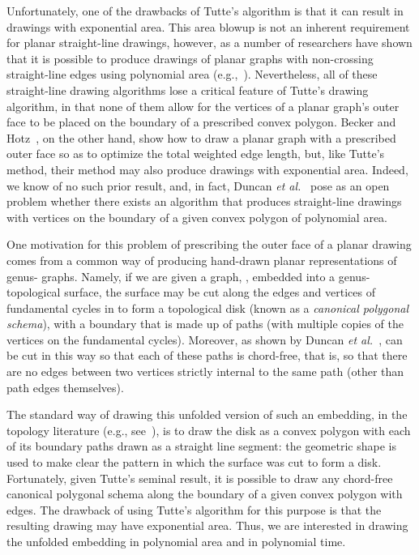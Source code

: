 \documentclass[11pt]{article}
\begin{document}
Unfortunately,
one of the drawbacks of Tutte's algorithm is that it
can result in drawings with exponential area.
This area blowup is not an inherent requirement for planar
straight-line drawings, however, as
a number of researchers have shown that it is possible to
produce drawings of planar graphs with non-crossing straight-line
edges using polynomial area
(e.g.,~\cite{ck-cgd3c-97,cp-ltadp-95,dpp,k-dpguc-96,s-epgg-90}).
Nevertheless, all of these straight-line drawing algorithms lose a
critical feature of Tutte's drawing algorithm, in that none of them
allow for the vertices of a planar graph's outer
face to be placed on the boundary of a prescribed
convex polygon.
Becker and Hotz~\cite{bh-olpgf-87}, on the other hand,
show how to draw a planar graph with
a prescribed outer face so as to optimize the total weighted edge
length, but, like Tutte's method,
their method may also produce drawings with exponential
area.
Indeed, we know of no such prior result, and, in fact,
Duncan {\it et al.}~\cite{duncan}
pose as an open problem whether there exists an algorithm
that produces straight-line drawings with vertices on the boundary
of a given convex polygon of polynomial area.

One motivation for this problem of prescribing the outer face of a planar drawing
comes from a common way of producing hand-drawn
planar representations of genus- graphs.
Namely, if we are given
a graph, , embedded into a
genus- topological surface,
the surface may be cut along
the edges and vertices of  fundamental cycles in  to form a topological disk (known as a \emph{canonical polygonal schema}), with a boundary that is made up
of  paths (with multiple copies of the vertices on the fundamental cycles).
Moreover, as shown by
Duncan {\it et al.}~\cite{duncan},
 can be cut in this way so that
each of these  paths is chord-free, that is,
so that there are no edges
between two vertices strictly internal to the same path (other than
path edges themselves).

The standard way of drawing this unfolded version of
such an embedding, in the topology
literature (e.g., see~\cite{lpvv-ccpso-01}),
is to draw the disk as a convex polygon with each of its  boundary paths drawn as a straight line
segment: the geometric shape is used to make clear the pattern in which the surface was cut to form a disk.  Fortunately, given Tutte's seminal result, it is
possible to draw any chord-free canonical polygonal schema along the
boundary of a given convex polygon with  edges.
The drawback of using Tutte's algorithm for this purpose is that the resulting drawing may have exponential area.
Thus, we are interested in drawing the unfolded embedding in
polynomial area and in polynomial time.
\end{document}
